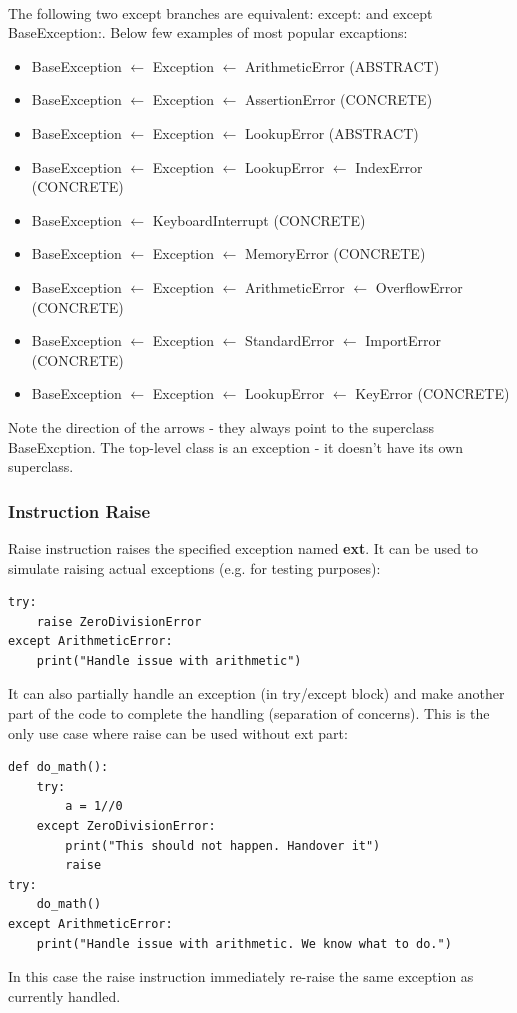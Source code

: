 \documentclass{article}
\begin{document}
\paragraph{}
The following two except branches are equivalent: except: and except BaseException:. 
Below few examples of most popular excaptions:
\begin{itemize}
\item BaseException $\leftarrow$ Exception $\leftarrow$ ArithmeticError (ABSTRACT)
\item BaseException $\leftarrow$ Exception $\leftarrow$ AssertionError (CONCRETE)
\item BaseException $\leftarrow$ Exception $\leftarrow$ LookupError (ABSTRACT)
\item BaseException $\leftarrow$ Exception $\leftarrow$ LookupError $\leftarrow$ IndexError (CONCRETE)
\item BaseException $\leftarrow$ KeyboardInterrupt (CONCRETE)
\item BaseException $\leftarrow$ Exception $\leftarrow$ MemoryError (CONCRETE)
\item BaseException $\leftarrow$ Exception $\leftarrow$ ArithmeticError $\leftarrow$ OverflowError (CONCRETE)
\item BaseException $\leftarrow$ Exception $\leftarrow$ StandardError $\leftarrow$ ImportError (CONCRETE)
\item BaseException $\leftarrow$ Exception $\leftarrow$ LookupError $\leftarrow$ KeyError (CONCRETE)

\end{itemize}
Note the direction of the arrows - they always point to the superclass BaseExcption. The top-level class is an exception - it doesn't have its own superclass.


\subsubsection{Instruction Raise}
Raise instruction raises the specified exception named \textbf{ext}. It can be used to simulate raising actual exceptions (e.g. for testing purposes):
\begin{lstlisting}[style=pystyle] 
try:
	raise ZeroDivisionError
except ArithmeticError:
	print("Handle issue with arithmetic")
\end{lstlisting}
It can also partially handle an exception (in try/except block) and make another part of the code to complete the handling (separation of concerns). This is the only use case where raise can be used without ext part:
\begin{lstlisting}[style=pystyle]
def do_math():
	try:
		a = 1//0
	except ZeroDivisionError:
		print("This should not happen. Handover it")
		raise
try:
	do_math()
except ArithmeticError:
	print("Handle issue with arithmetic. We know what to do.")
\end{lstlisting}
In this case the raise instruction immediately re-raise the same exception as currently handled.
\end{document}
